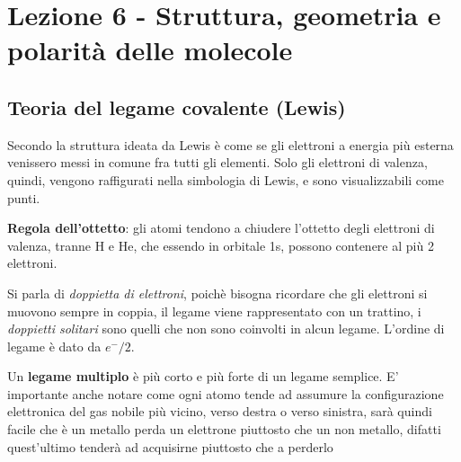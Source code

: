 \chapter{Lezione 6 - Struttura, geometria e polarità delle molecole}

\section{Teoria del legame covalente (Lewis)}
Secondo la struttura ideata da Lewis è come se gli elettroni a energia più esterna venissero messi in comune fra tutti gli elementi. Solo gli elettroni di valenza, quindi, vengono raffigurati nella simbologia di Lewis, e sono visualizzabili come punti. 

\textbf{Regola dell'ottetto}: gli atomi tendono a chiudere l'ottetto degli elettroni di valenza, tranne H e He, che essendo in orbitale 1s, possono contenere al più 2 elettroni. 


Si parla di \emph{doppietta di elettroni}, poichè bisogna ricordare che gli elettroni si muovono sempre in coppia, il legame viene rappresentato con un trattino, i \emph{doppietti solitari} sono quelli che non sono coinvolti in alcun legame. L'ordine di legame è dato da $e^{-}/2$. 


Un \textbf{legame multiplo} è più corto e più forte di un legame semplice. E' importante anche notare come ogni atomo tende ad assumure la configurazione elettronica del gas nobile più vicino, verso destra o verso sinistra, sarà quindi facile che è un metallo perda un elettrone piuttosto che un non metallo, difatti quest'ultimo tenderà ad acquisirne piuttosto che a perderlo


